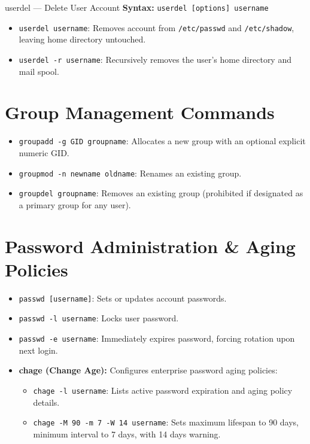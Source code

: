 \begin{commandbox}{userdel --- Delete User Account}
\textbf{Syntax:} \texttt{userdel [options] username}
\begin{itemize}[leftmargin=1.5em]
    \item \texttt{userdel username}: Removes account from \texttt{/etc/passwd} and \texttt{/etc/shadow}, leaving home directory untouched.
    \item \texttt{userdel -r username}: Recursively removes the user's home directory and mail spool.
\end{itemize}
\end{commandbox}

\section{Group Management Commands}
\begin{itemize}[leftmargin=1.5em]
    \item \texttt{groupadd -g GID groupname}: Allocates a new group with an optional explicit numeric GID.
    \item \texttt{groupmod -n newname oldname}: Renames an existing group.
    \item \texttt{groupdel groupname}: Removes an existing group (prohibited if designated as a primary group for any user).
\end{itemize}

\section{Password Administration \& Aging Policies}
\begin{itemize}[leftmargin=1.5em]
    \item \texttt{passwd [username]}: Sets or updates account passwords.
    \item \texttt{passwd -l username}: Locks user password.
    \item \texttt{passwd -e username}: Immediately expires password, forcing rotation upon next login.
    \item \textbf{chage (Change Age):} Configures enterprise password aging policies:
    \begin{itemize}
        \item \texttt{chage -l username}: Lists active password expiration and aging policy details.
        \item \texttt{chage -M 90 -m 7 -W 14 username}: Sets maximum lifespan to 90 days, minimum interval to 7 days, with 14 days warning.
    \end{itemize}
\end{itemize}

